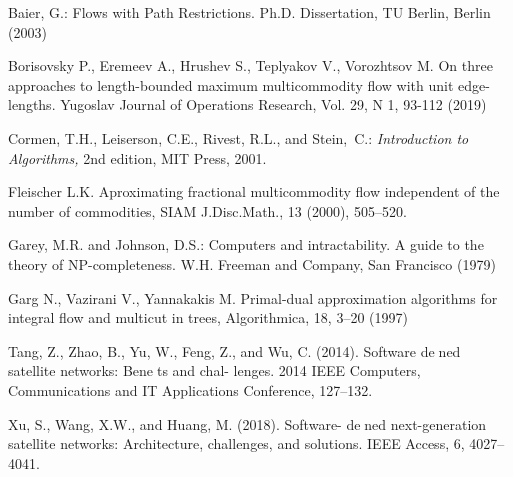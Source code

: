 \documentclass{ifacconf}
\begin{document}
\begin{thebibliography}{xx}  %
 Baier, G.: Flows with Path Restrictions.
Ph.D. Dissertation, TU Berlin, Berlin (2003)

 Borisovsky P., Eremeev A., Hrushev S., Teplyakov V., Vorozhtsov M. On three approaches to length-bounded maximum multicommodity flow with unit edge-lengths. Yugoslav Journal of Operations Research, Vol. 29, N 1, 93-112 (2019) 

Cormen, T.H., Leiserson, C.E., Rivest, R.L., and Stein,~C.: {\em
Introduction to Algorithms,} 2nd edition, MIT Press, 2001.

 Fleischer L.K. Aproximating fractional multicommodity flow independent of the
number of commodities, SIAM J.Disc.Math., 13 (2000), 505--520.

 {Garey, M.R. and Johnson, D.S.}: Computers and intractability.
A guide to the theory of NP-completeness. W.H. Freeman and
Company, San Francisco (1979)

 Garg N., Vazirani V., Yannakakis M.
Primal-dual approximation algorithms  for integral flow and
multicut in trees, Algorithmica, 18, 3--20 (1997)

Tang, Z., Zhao, B., Yu, W., Feng, Z., and Wu, C. (2014).
Software dened satellite networks: Benets and chal-
lenges. 2014 IEEE Computers, Communications and
IT Applications Conference, 127--132.

 Xu, S., Wang, X.W., and Huang, M. (2018). Software-
dened next-generation satellite networks: Architecture,
challenges, and solutions. IEEE Access, 6, 4027--4041.


\end{thebibliography}



\end{document}
